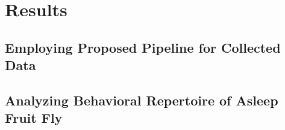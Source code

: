 \chapter{Results}

\section{Employing Proposed Pipeline for Collected Data}\label{section:employing-proposed-pipeline}

\section{Analyzing Behavioral Repertoire of Asleep Fruit Fly}
